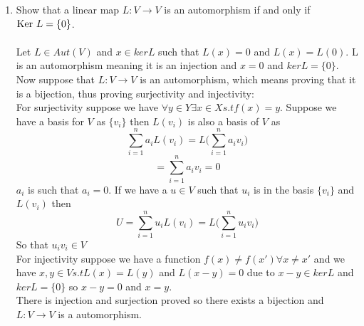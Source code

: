 \documentclass[12pt]{article}
\begin{document}
\begin{enumerate}
\item Show that a linear map $L: V\rightarrow V$ is an automorphism if and only if ${\rm Ker}~L= \{0\}$.
\\
\\
Let $L \in Aut(V)$ and $x \in ker L$ such that $L(x) =0$ and $L(x)=L(0)$. L is an automorphism meaning it is an injection and $x = 0$ and $ker L = \{0\}$. 
\\
Now suppose that $L: V \rightarrow V$ is an automorphism, which means proving that it is a bijection, thus proving surjectivity and injectivity:
\\
For surjectivity suppose we have $\forall y \in Y \exists x \in X s.t f(x) = y$. Suppose we have a basis for $V$ as $\{v_i\}$ then $L(v_i)$ is also a basis of $V$ as 
$$ \sum_{i=1}^n a_i L(v_i) = L \Big( \sum_{i=1}^n a_i v_i\Big) $$
$$ = \sum_{i=1}^n a_i v_i = 0 $$
$a_i$ is such that $a_i =0$. If we have a $u \in V $ such that $u_i$ is in the basis $\{v_i\}$ and $L(v_i)$ then 
$$ U = \sum_{i=1}^n u_i L(v_i) = L \Big(\sum_{i=1}^n u_i v_i\Big) $$
So that $u_i v_i \in V$ 
\\
For injectivity suppose we have a function $f(x) \neq f(x') \forall x \neq x' $ and we have $ x,y \in V s.t L(x) = L(y) $ and $L(x-y)=0$ due to $x-y \in ker L$ and $ker L = \{0\}$ so $x-y =0$ and $x=y$.
\\
There is injection and surjection proved so there exists a bijection and $L:V \rightarrow V$ is a automorphism. 

\end{enumerate}
\end{document}
